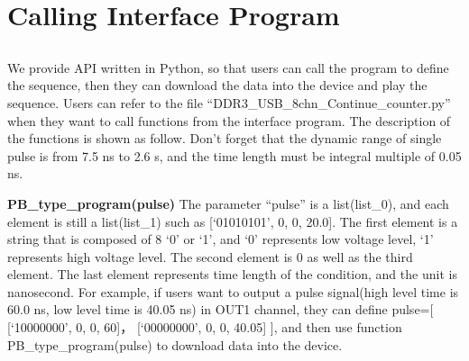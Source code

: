 \chapter{\heiti Calling Interface Program}
\section{}
We provide API written in Python, so that users can call the program to define the sequence, then they can download the data into the device and play the sequence. Users can refer to the file “DDR3\_USB\_8chn\_Continue\_counter.py”  when they want to call functions from the interface program. The description of the functions is shown as follow. Don't forget that the dynamic range of single pulse is from 7.5 ns to 2.6 s, and the time length must be integral multiple of 0.05 ns.
\vspace{0.4cm}

\noindent\fontsize{12pt}{\baselineskip}\textbf{PB\_type\_program(pulse)}
The parameter “pulse” is a list(list\_0), and each element is still a list(list\_1) such as [`01010101', { }0, { }0, { }20.0]. The first element is a string that is composed of 8 ‘0’ or ‘1’, and ‘0’ represents low voltage level, ‘1’ represents high voltage level. The second element is 0 as well as the third element. The last element represents time length of the condition, and the unit is nanosecond. For example, if users want to output a pulse signal(high level time is 60.0 ns, low level time is 40.05 ns) in OUT1 channel, they can define pulse=[{ }[`10000000', { }0, { }0, { }60]， [`00000000', { }0, { }0, { }40.05]{ }], and then use function PB\_type\_program(pulse) to download data into the device.
\vspace{0.4cm}

